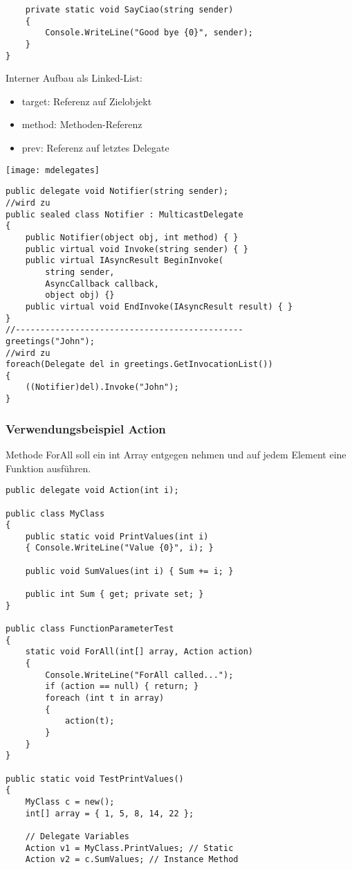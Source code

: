 \begin{multicols*}{2}
\begin{lstlisting}
    private static void SayCiao(string sender)
    {
        Console.WriteLine("Good bye {0}", sender); 
    }
}
\end{lstlisting}
Interner Aufbau als Linked-List:
\begin{itemize}
    \item target: Referenz auf Zielobjekt
    \item method: Methoden-Referenz
    \item prev: Referenz auf letztes Delegate
\end{itemize}
\texttt{[image: mdelegates]}
\begin{lstlisting}
public delegate void Notifier(string sender); 
//wird zu
public sealed class Notifier : MulticastDelegate
{
    public Notifier(object obj, int method) { }
    public virtual void Invoke(string sender) { }
    public virtual IAsyncResult BeginInvoke(
        string sender,
        AsyncCallback callback,
        object obj) {}
    public virtual void EndInvoke(IAsyncResult result) { } 
}
//----------------------------------------------
greetings("John");
//wird zu
foreach(Delegate del in greetings.GetInvocationList())
{
    ((Notifier)del).Invoke("John");
}
\end{lstlisting}
\subsubsection{Verwendungsbeispiel Action}
Methode ForAll soll ein int Array entgegen nehmen und auf jedem Element eine Funktion ausführen.
\begin{lstlisting}
public delegate void Action(int i);

public class MyClass
{
    public static void PrintValues(int i)
    { Console.WriteLine("Value {0}", i); }

    public void SumValues(int i) { Sum += i; }
    
    public int Sum { get; private set; }
}

public class FunctionParameterTest
{
    static void ForAll(int[] array, Action action)
    {
        Console.WriteLine("ForAll called...");
        if (action == null) { return; }
        foreach (int t in array)
        {
            action(t); 
        }
    } 
}

public static void TestPrintValues()
{
    MyClass c = new();
    int[] array = { 1, 5, 8, 14, 22 };
    
    // Delegate Variables
    Action v1 = MyClass.PrintValues; // Static
    Action v2 = c.SumValues; // Instance Method


\end{lstlisting}
\end{multicols*}
